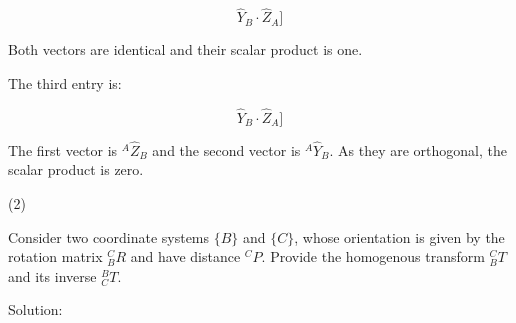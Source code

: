 \begin{equation*}
[\hat{Y}_B\cdot\hat{X}_A  [\hat{Y}_B\cdot\hat{X}_A
 \hat{Y}_B\cdot\hat{Y}_A . \hat{Y}_B\cdot\hat{Y}_A
 \hat{Y}_B\cdot\hat{Z}_A]  \hat{Y}_B\cdot\hat{Z}_A]
\end{equation*}

Both vectors are identical and their scalar product is one.

The third entry is:

\begin{equation*}
[\hat{Z}_B\cdot\hat{X}_A   [\hat{Y}_B\cdot\hat{X}_A
 \hat{Z}_B\cdot\hat{Y}_A .  \hat{Y}_B\cdot\hat{Y}_A
 \hat{Z}_B\cdot\hat{Z}_A]   \hat{Y}_B\cdot\hat{Z}_A]
\end{equation*}

The first vector is $^A\hat{Z}_B$ and the second vector is $^A\hat{Y}_B$. As they are orthogonal, the scalar product is zero.

(2)

Consider two coordinate systems $\{B\}$ and $\{C\}$, whose orientation is given by the rotation matrix $^C_BR$ and have distance $^CP$. Provide the homogenous transform $^C_BT$ and its inverse $^B_CT$.

Solution:

\begin{equation*}
[
    ^C_BR    ^CP
	0   0   0   1]
\end{equation*}

